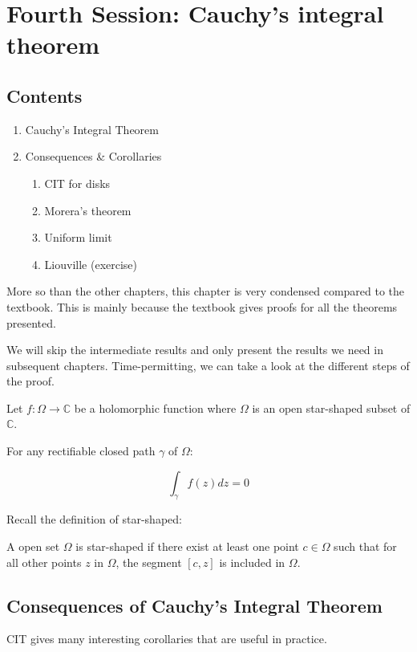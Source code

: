 \section{Fourth Session: Cauchy's integral theorem}
\subsection*{Contents}
\begin{enumerate}
    \item Cauchy's Integral Theorem
    \item Consequences \& Corollaries
        \begin{enumerate}
            \item CIT for disks
            \item Morera's theorem
            \item Uniform limit
            \item Liouville (exercise)
        \end{enumerate}
\end{enumerate}
More so than the other chapters, this chapter is very condensed compared to the textbook. This is mainly because the textbook gives proofs for all the theorems presented.

We will skip the intermediate results and only present the results we need in subsequent chapters. Time-permitting, we can take a look at the different steps of the proof.

\begin{thm*}
    Let $f: \Omega \rightarrow \mathbb{C}$ be a holomorphic function where $\Omega$ is an open star-shaped subset of $\mathbb{C}$.

    For any rectifiable closed path $\gamma$ of $\Omega$:

    $$ \int_\gamma f(z)dz = 0 $$
\end{thm*}

Recall the definition of star-shaped:

\begin{defi}
    A open set $\Omega$ is star-shaped if there exist at least one point $c\in\Omega$ such that for all other points $z$ in $\Omega$, the segment $[c, z]$ is included in $\Omega$.
\end{defi}

\subsection*{Consequences of Cauchy's Integral Theorem}
CIT gives many interesting corollaries that are useful in practice.


